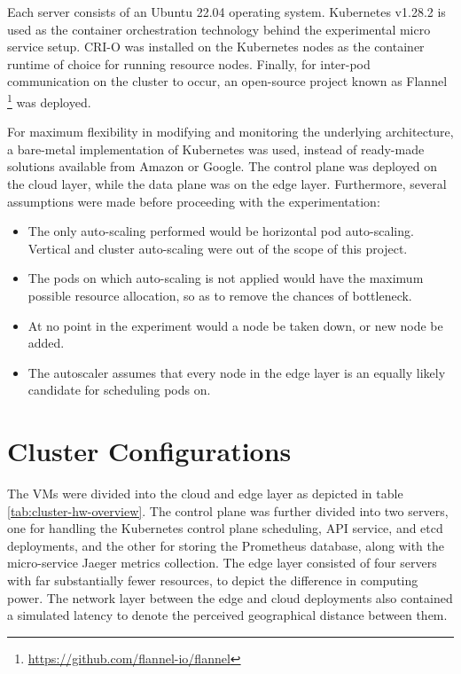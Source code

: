 Each server consists of an Ubuntu 22.04 operating system. Kubernetes v1.28.2 is used as the container orchestration technology behind the experimental micro service setup. CRI-O was installed on the Kubernetes nodes as the container runtime of choice for running resource nodes. Finally, for inter-pod communication on the cluster to occur, an open-source project known as Flannel \footnote{\url{https://github.com/flannel-io/flannel}} was deployed.\par

For maximum flexibility in modifying and monitoring the underlying architecture, a bare-metal implementation of Kubernetes was used, instead of ready-made solutions available from Amazon or Google. The control plane was deployed on the cloud layer, while the data plane was on the edge layer. Furthermore, several assumptions were made before proceeding with the experimentation:

\begin{itemize}
    \item The only auto-scaling performed would be horizontal pod auto-scaling. Vertical and cluster auto-scaling were out of the scope of this project.
    \item The pods on which auto-scaling is not applied would have the maximum possible resource allocation, so as to remove the chances of bottleneck.
    \item At no point in the experiment would a node be taken down, or new node be added.
    \item The autoscaler assumes that every node in the edge layer is an equally likely candidate for scheduling pods on.
\end{itemize}

\section{Cluster Configurations}
\label{sec:ch6-cluster-config}

The VMs were divided into the cloud and edge layer as depicted in table \ref{tab:cluster-hw-overview}. The control plane was further divided into two servers, one for handling the Kubernetes control plane scheduling, API service, and etcd deployments, and the other for storing the Prometheus database, along with the micro-service Jaeger metrics collection. The edge layer consisted of four servers with far substantially fewer resources, to depict the difference in computing power. The network layer between the edge and cloud deployments also contained a simulated latency to denote the perceived geographical distance between them.\par

